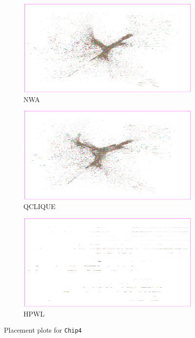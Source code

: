 \begin{figure}[p]
 \centering

 \begin{subfigure}{.75\textwidth}
  \includegraphics[width=\textwidth]{hpwl_qclique_comparisons/placement_Chip4_NWA.png}
  \caption{NWA}
 \end{subfigure}
 
 \bigskip
 
 \begin{subfigure}{.75\textwidth}
  \includegraphics[width=\textwidth]{hpwl_qclique_comparisons/placement_Chip4_QCLIQUE.png}
  \caption{QCLIQUE}
 \end{subfigure}
 
 \bigskip
 
 \begin{subfigure}{.75\textwidth}
  \includegraphics[width=\textwidth]{hpwl_qclique_comparisons/placement_Chip4_HPWL.png}
  \caption{HPWL}
 \end{subfigure}

 \caption{Placement plots for \texttt{Chip4}}
 \label{fig:placement_Chip4_depending_on_objective_function}
\end{figure}
